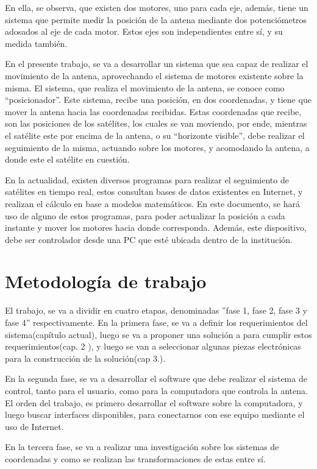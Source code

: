 En ella, se observa, que existen dos motores, uno para cada eje, además, tiene un sistema que permite medir la posición de la antena mediante dos potenciómetros adosados al eje de cada motor. Estos ejes son independientes entre sí, y su medida también. 

En el presente trabajo, se va a desarrollar un sistema que sea capaz de realizar el movimiento de la antena, aprovechando el sistema de motores existente sobre la misma. El sistema, que realiza el movimiento de la antena, se conoce como ``posicionador''. Este sistema, recibe una posición, en dos coordenadas, y tiene que mover la antena hacia las coordenadas recibidas. Estas coordenadas que recibe, son las posiciones de los satélites, los cuales se van moviendo, por ende, mientras el satélite este por encima de la antena, o su ``horizonte visible'', debe realizar el seguimiento de la misma, actuando sobre los motores, y acomodando la antena, a donde este el satélite en cuestión.

En la actualidad, existen diversos programas para realizar el seguimiento de satélites en tiempo real, estos consultan bases de datos existentes en Internet, y realizan el cálculo en base a modelos matemáticos. En este documento, se hará uso de alguno de estos programas, para poder actualizar la posición a cada instante y mover los motores hacia donde corresponda. Además, este dispositivo, debe ser controlador desde una PC que esté ubicada dentro de la institución. 

\section{Metodología de trabajo}

El trabajo, se va a dividir en cuatro etapas, denominadas ''fase 1, fase 2, fase 3 y fase 4'' respectivamente. En la primera fase, se va a definir los requerimientos del sistema(capítulo actual), luego se va a proponer una solución a para cumplir estos requerimientos(cap. 2 ), y luego se van a seleccionar algunas piezas electrónicas para la construcción de la solución(cap 3.). 

En la segunda fase, se va a desarrollar el software que debe realizar el sistema de control, tanto para el usuario, como para la computadora que controla la antena. El orden del trabajo, es primero desarrollar el software sobre la computadora, y luego buscar interfaces disponibles, para conectarnos con ese equipo mediante el uso de Internet. 

En la tercera fase, se va a realizar una investigación sobre los sistemas de coordenadas y como se realizan las transformaciones de estas entre sí.

